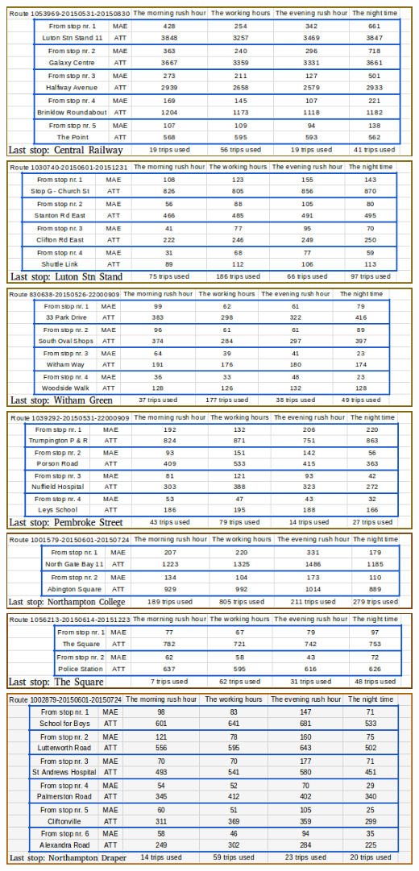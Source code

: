\documentclass[12pt,a4paper,oneside,openright]{report}
\begin{document}
\includegraphics[width=\textwidth]{figs/table_of_1053969.png}
\includegraphics[width=\textwidth]{figs/table_of_1030740.png}
\includegraphics[width=\textwidth]{figs/table_of_830638.png}
\includegraphics[width=\textwidth]{figs/table_of_1039292.png}
\includegraphics[width=\textwidth]{figs/table_of_1001579.png}
\includegraphics[width=\textwidth]{figs/table_of_1056213.png}
\includegraphics[width=\textwidth]{figs/table_of_1002879.png}
\end{document}
